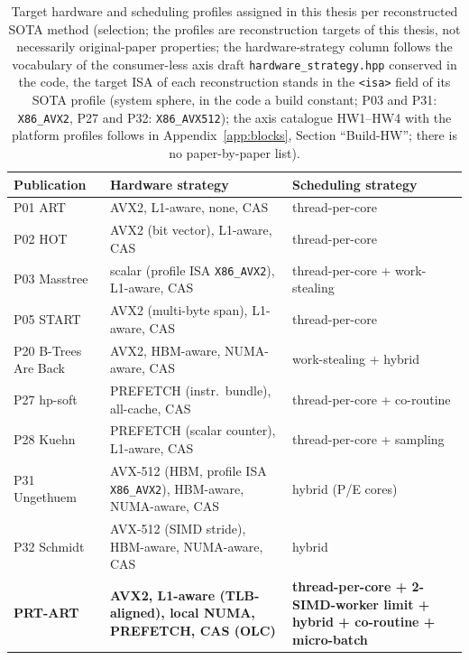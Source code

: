 \begin{nurlang}
\begin{table}[!htbp]
  \centering\small
  \caption{Target hardware and scheduling profiles assigned in this thesis per reconstructed SOTA method (selection; the profiles are reconstruction targets of this thesis, not necessarily original-paper properties; the hardware-strategy column follows the vocabulary of the consumer-less axis draft \texttt{hardware\_strategy.hpp} conserved in the code, the target ISA of each reconstruction stands in the \texttt{<isa>} field of its SOTA profile (system sphere, in the code a build constant; P03 and P31: \texttt{X86\_AVX2}, P27 and P32: \texttt{X86\_AVX512}); the axis catalogue HW1--HW4 with the platform profiles follows in Appendix~\ref{app:blocks}, Section \enquote{Build-HW}; there is no paper-by-paper list).}\label{tab:hw-sched}
  \begin{tabular}{@{}l p{4.6cm} p{5.6cm}@{}}
    \toprule
    \textbf{Publication} & \textbf{Hardware strategy} & \textbf{Scheduling strategy} \\
    \midrule
    P01 ART & AVX2, L1-aware, none, CAS & thread-per-core \\
    P02 HOT & AVX2 (bit vector), L1-aware, CAS & thread-per-core \\
    P03 Masstree & scalar (profile ISA \texttt{X86\_AVX2}), L1-aware, CAS & thread-per-core + work-stealing \\
    P05 START & AVX2 (multi-byte span), L1-aware, CAS & thread-per-core \\
    P20 B-Trees Are Back & AVX2, HBM-aware, NUMA-aware, CAS & work-stealing + hybrid \\
    P27 hp-soft & PREFETCH (instr.\ bundle), all-cache, CAS & thread-per-core + co-routine \\
    P28 Kuehn & PREFETCH (scalar counter), L1-aware, CAS & thread-per-core + sampling \\
    P31 Ungethuem & AVX-512 (HBM, profile ISA \texttt{X86\_AVX2}), HBM-aware, NUMA-aware, CAS & hybrid (P/E cores) \\
    P32 Schmidt & AVX-512 (SIMD stride), HBM-aware, NUMA-aware, CAS & hybrid \\
    \midrule
    \textbf{PRT-ART} & \textbf{AVX2, L1-aware (TLB-aligned), local NUMA, PREFETCH, CAS (OLC)} & \textbf{thread-per-core + 2-SIMD-worker limit + hybrid + co-routine + micro-batch} \\
    \bottomrule
  \end{tabular}
\end{table}
\end{nurlang}

